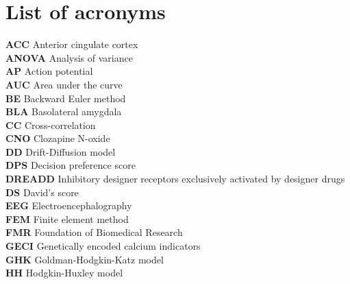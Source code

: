 \documentclass[12pt, a4paper]{report}
\begin{document}
	
	\chapter*{List of acronyms}

\noindent
\textbf{ACC} Anterior cingulate cortex \\

\noindent
\textbf{ANOVA} Analysis of variance \\

\noindent
\textbf{AP} Action potential \\

\noindent
\textbf{AUC} Area under the curve \\

\noindent
\textbf{BE} Backward Euler method \\

\noindent
\textbf{BLA} Basolateral amygdala \\

\noindent
\textbf{CC} Cross-correlation \\

\noindent
\textbf{CNO} Clozapine N-oxide \\

\noindent
\textbf{DD} Drift-Diffusion model \\

\noindent
\textbf{DPS} Decision preference score \\

\noindent
\textbf{DREADD} Inhibitory designer receptors exclusively activated by designer drugs \\

\noindent
\textbf{DS} David's score \\

\noindent
\textbf{EEG} Electroencephalography \\

\noindent
\textbf{FEM} Finite element method \\

\noindent
\textbf{FMR} Foundation of Biomedical Research \\

\noindent
\textbf{GECI} Genetically encoded calcium indicators \\

\noindent
\textbf{GHK} Goldman-Hodgkin-Katz model \\

\noindent
\textbf{HH} Hodgkin-Huxley model \\
\end{document}
